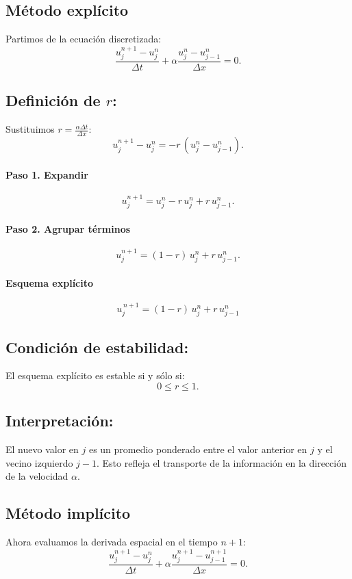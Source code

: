 \documentclass[12pt,a4paper]{article}
\begin{document}
\subsection{Método explícito}

Partimos de la ecuación discretizada:
\[
\frac{u_j^{n+1}-u_j^n}{\Delta t} + \alpha \frac{u_j^n - u_{j-1}^n}{\Delta x} = 0.
\]

\subsection*{Definición de $r$:}
Sustituimos $r = \tfrac{\alpha \Delta t}{\Delta x}$:
\[
u_j^{n+1}-u_j^n = -r\,(u_j^n - u_{j-1}^n).
\]

\paragraph{Paso 1. Expandir}  
\[
u_j^{n+1} = u_j^n - r\,u_j^n + r\,u_{j-1}^n.
\]

\paragraph{Paso 2. Agrupar términos}  
\[
u_j^{n+1} = (1-r)\,u_j^n + r\,u_{j-1}^n.
\]

\paragraph{Esquema explícito}  
\[
\boxed{u_j^{\,n+1} = (1-r)\,u_j^n + r\,u_{j-1}^n}
\]

\subsection*{Condición de estabilidad:}
El esquema explícito es estable si y sólo si:
\[
0 \leq r \leq 1.
\]

\subsection*{Interpretación:}
El nuevo valor en $j$ es un promedio ponderado entre el valor anterior en $j$ y el vecino izquierdo $j-1$.  
Esto refleja el transporte de la información en la dirección de la velocidad $\alpha$.

\subsection{Método implícito}

Ahora evaluamos la derivada espacial en el tiempo $n+1$:
\[
\frac{u_j^{n+1}-u_j^n}{\Delta t} + \alpha \frac{u_j^{n+1} - u_{j-1}^{n+1}}{\Delta x} = 0.
\]
\end{document}
